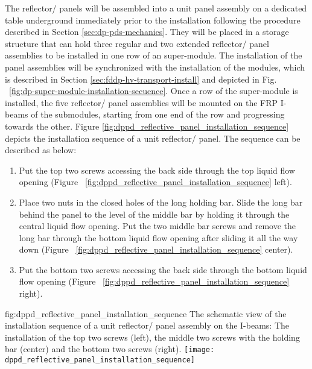 The reflector/ panels will be assembled into a unit panel assembly on a dedicated table underground immediately prior to the installation following the procedure described in Section \ref{sec:dp-pds-mechanics}. They will be placed in a storage structure that can hold three regular and two extended reflector/ panel assemblies to be installed in one row of an  super-module. The installation of the panel assemblies will be synchronized with the installation of the  modules, which is described in Section \ref{sec:fddp-hv-transport-install} and depicted in Fig. ~\ref{fig:dp-super-module-installation-secuence}. Once a row of the  super-module is installed, the five reflector/ panel assemblies will be mounted on the FRP I-beams of the  submodules, starting from one end of the row and progressing towards the other. Figure \ref{fig:dppd_reflective_panel_installation_sequence} depicts the installation sequence of a unit reflector/ panel. The sequence can be described as below:

\begin{enumerate}
\item Put the top two screws accessing the back side through the top liquid flow opening (Figure~ \ref{fig:dppd_reflective_panel_installation_sequence}  left).
\item Place two nuts in the closed holes of the long holding bar. Slide the long bar behind the panel to the level of the middle bar by holding it through the central liquid flow opening. Put the two middle bar screws and remove the long bar through the bottom liquid flow opening after sliding it all the way down (Figure~ \ref{fig:dppd_reflective_panel_installation_sequence}  center).
\item Put the bottom two screws accessing the back side through the bottom liquid flow opening (Figure~ \ref{fig:dppd_reflective_panel_installation_sequence}  right).
\end{enumerate}

\begin{dunefigure}{fig:dppd_reflective_panel_installation_sequence}
{The schematic view of the installation sequence of a unit reflector/ panel assembly on the  I-beams: The installation of the top two screws (left), the middle two screws with the holding bar (center) and the bottom two screws (right).}
\texttt{[image: dppd\_reflective\_panel\_installation\_sequence]}
\end{dunefigure}

